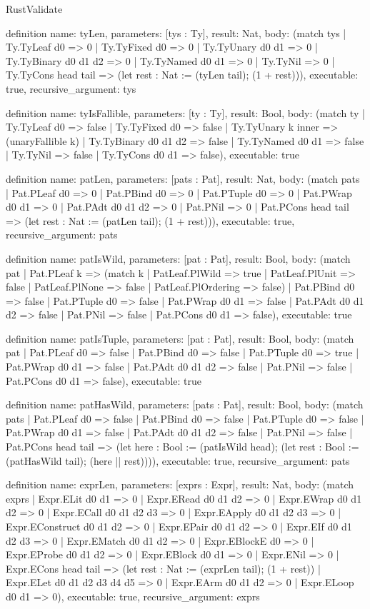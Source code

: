 \begin{lexlean}{RustValidate}
\begin{semanticmodule}
definition{
  name: tyLen,
  parameters: [tys : Ty],
  result: Nat,
  body: (match tys
    | Ty.TyLeaf d0 => 0
    | Ty.TyFixed d0 => 0
    | Ty.TyUnary d0 d1 => 0
    | Ty.TyBinary d0 d1 d2 => 0
    | Ty.TyNamed d0 d1 => 0
    | Ty.TyNil => 0
    | Ty.TyCons head tail => (let rest : Nat := (tyLen tail); (1 + rest))),
  executable: true,
  recursive_argument: tys
}

definition{
  name: tyIsFallible,
  parameters: [ty : Ty],
  result: Bool,
  body: (match ty
    | Ty.TyLeaf d0 => false
    | Ty.TyFixed d0 => false
    | Ty.TyUnary k inner => (unaryFallible k)
    | Ty.TyBinary d0 d1 d2 => false
    | Ty.TyNamed d0 d1 => false
    | Ty.TyNil => false
    | Ty.TyCons d0 d1 => false),
  executable: true
}

definition{
  name: patLen,
  parameters: [pats : Pat],
  result: Nat,
  body: (match pats
    | Pat.PLeaf d0 => 0
    | Pat.PBind d0 => 0
    | Pat.PTuple d0 => 0
    | Pat.PWrap d0 d1 => 0
    | Pat.PAdt d0 d1 d2 => 0
    | Pat.PNil => 0
    | Pat.PCons head tail => (let rest : Nat := (patLen tail); (1 + rest))),
  executable: true,
  recursive_argument: pats
}

definition{
  name: patIsWild,
  parameters: [pat : Pat],
  result: Bool,
  body: (match pat
    | Pat.PLeaf k => (match k
      | PatLeaf.PlWild => true
      | PatLeaf.PlUnit => false
      | PatLeaf.PlNone => false
      | PatLeaf.PlOrdering => false)
    | Pat.PBind d0 => false
    | Pat.PTuple d0 => false
    | Pat.PWrap d0 d1 => false
    | Pat.PAdt d0 d1 d2 => false
    | Pat.PNil => false
    | Pat.PCons d0 d1 => false),
  executable: true
}

definition{
  name: patIsTuple,
  parameters: [pat : Pat],
  result: Bool,
  body: (match pat
    | Pat.PLeaf d0 => false
    | Pat.PBind d0 => false
    | Pat.PTuple d0 => true
    | Pat.PWrap d0 d1 => false
    | Pat.PAdt d0 d1 d2 => false
    | Pat.PNil => false
    | Pat.PCons d0 d1 => false),
  executable: true
}

definition{
  name: patHasWild,
  parameters: [pats : Pat],
  result: Bool,
  body: (match pats
    | Pat.PLeaf d0 => false
    | Pat.PBind d0 => false
    | Pat.PTuple d0 => false
    | Pat.PWrap d0 d1 => false
    | Pat.PAdt d0 d1 d2 => false
    | Pat.PNil => false
    | Pat.PCons head tail => (let here : Bool := (patIsWild head); (let rest : Bool := (patHasWild tail); (here || rest)))),
  executable: true,
  recursive_argument: pats
}

definition{
  name: exprLen,
  parameters: [exprs : Expr],
  result: Nat,
  body: (match exprs
    | Expr.ELit d0 d1 => 0
    | Expr.ERead d0 d1 d2 => 0
    | Expr.EWrap d0 d1 d2 => 0
    | Expr.ECall d0 d1 d2 d3 => 0
    | Expr.EApply d0 d1 d2 d3 => 0
    | Expr.EConstruct d0 d1 d2 => 0
    | Expr.EPair d0 d1 d2 => 0
    | Expr.EIf d0 d1 d2 d3 => 0
    | Expr.EMatch d0 d1 d2 => 0
    | Expr.EBlockE d0 => 0
    | Expr.EProbe d0 d1 d2 => 0
    | Expr.EBlock d0 d1 => 0
    | Expr.ENil => 0
    | Expr.ECons head tail => (let rest : Nat := (exprLen tail); (1 + rest))
    | Expr.ELet d0 d1 d2 d3 d4 d5 => 0
    | Expr.EArm d0 d1 d2 => 0
    | Expr.ELoop d0 d1 => 0),
  executable: true,
  recursive_argument: exprs
}


\end{semanticmodule}
\end{lexlean}
